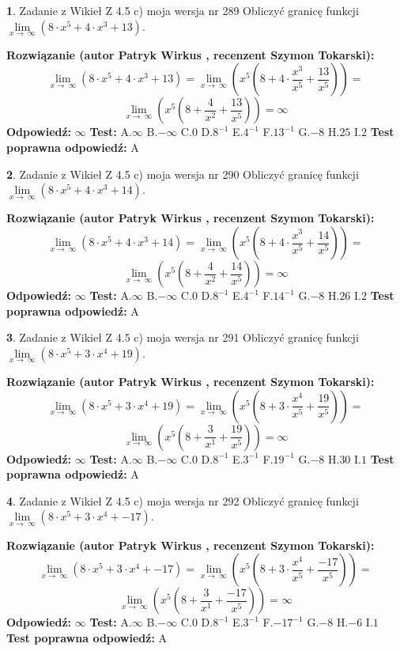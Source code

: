 \documentclass[12pt, a4paper]{article}
\theoremstyle{definition} %
\newtheorem{zad}{}
\newcommand{\zadStart}[1]{\begin{zad}#1\newline}
\newcommand{\zadStop}{\end{zad}}
\newcommand{\rozwStart}[2]{\noindent \textbf{Rozwiązanie (autor #1 , recenzent #2): }\newline}
\newcommand{\rozwStop}{\newline}
\newcommand{\odpStart}{\noindent \textbf{Odpowiedź:}\newline}
\newcommand{\odpStop}{\newline}
\newcommand{\testStart}{\noindent \textbf{Test:}\newline}
\newcommand{\testStop}{\newline}
\newcommand{\kluczStart}{\noindent \textbf{Test poprawna odpowiedź:}\newline}
\newcommand{\kluczStop}{\newline}
\begin{document}
\zadStart{Zadanie z Wikieł Z 4.5 c) moja wersja nr 289}
Obliczyć granicę funkcji  $\lim\limits_{x\to\ \infty}(8 \cdot x^{5}+4 \cdot x^{3}+13)$.
\zadStop
\rozwStart{Patryk Wirkus}{Szymon Tokarski}
$$\lim\limits_{x\to\ \infty}(8 \cdot x^{5}+4 \cdot x^{3}+13) = \lim\limits_{x\to\ \infty}(x^{5}(8 +4 \cdot \frac{x^{3}}{x^{5}}+\frac{13}{x^{5}})) =$$ $$\lim\limits_{x\to\ \infty}(x^{5}(8 +\frac{4}{x^{2}}+\frac{13}{x^{5}})) =\infty$$
\rozwStop
\odpStart
$\infty$
\odpStop
\testStart
A.$\infty$ B.$-\infty$ C.$0$ D.$8^{-1}$ E.$4^{-1}$
F.$13^{-1}$ G.$-8$
H.$25$
I.$2$
\testStop
\kluczStart
A
\kluczStop



\zadStart{Zadanie z Wikieł Z 4.5 c) moja wersja nr 290}
Obliczyć granicę funkcji  $\lim\limits_{x\to\ \infty}(8 \cdot x^{5}+4 \cdot x^{3}+14)$.
\zadStop
\rozwStart{Patryk Wirkus}{Szymon Tokarski}
$$\lim\limits_{x\to\ \infty}(8 \cdot x^{5}+4 \cdot x^{3}+14) = \lim\limits_{x\to\ \infty}(x^{5}(8 +4 \cdot \frac{x^{3}}{x^{5}}+\frac{14}{x^{5}})) =$$ $$\lim\limits_{x\to\ \infty}(x^{5}(8 +\frac{4}{x^{2}}+\frac{14}{x^{5}})) =\infty$$
\rozwStop
\odpStart
$\infty$
\odpStop
\testStart
A.$\infty$ B.$-\infty$ C.$0$ D.$8^{-1}$ E.$4^{-1}$
F.$14^{-1}$ G.$-8$
H.$26$
I.$2$
\testStop
\kluczStart
A
\kluczStop



\zadStart{Zadanie z Wikieł Z 4.5 c) moja wersja nr 291}
Obliczyć granicę funkcji  $\lim\limits_{x\to\ \infty}(8 \cdot x^{5}+3 \cdot x^{4}+19)$.
\zadStop
\rozwStart{Patryk Wirkus}{Szymon Tokarski}
$$\lim\limits_{x\to\ \infty}(8 \cdot x^{5}+3 \cdot x^{4}+19) = \lim\limits_{x\to\ \infty}(x^{5}(8 +3 \cdot \frac{x^{4}}{x^{5}}+\frac{19}{x^{5}})) =$$ $$\lim\limits_{x\to\ \infty}(x^{5}(8 +\frac{3}{x^{1}}+\frac{19}{x^{5}})) =\infty$$
\rozwStop
\odpStart
$\infty$
\odpStop
\testStart
A.$\infty$ B.$-\infty$ C.$0$ D.$8^{-1}$ E.$3^{-1}$
F.$19^{-1}$ G.$-8$
H.$30$
I.$1$
\testStop
\kluczStart
A
\kluczStop



\zadStart{Zadanie z Wikieł Z 4.5 c) moja wersja nr 292}
Obliczyć granicę funkcji  $\lim\limits_{x\to\ \infty}(8 \cdot x^{5}+3 \cdot x^{4}+-17)$.
\zadStop
\rozwStart{Patryk Wirkus}{Szymon Tokarski}
$$\lim\limits_{x\to\ \infty}(8 \cdot x^{5}+3 \cdot x^{4}+-17) = \lim\limits_{x\to\ \infty}(x^{5}(8 +3 \cdot \frac{x^{4}}{x^{5}}+\frac{-17}{x^{5}})) =$$ $$\lim\limits_{x\to\ \infty}(x^{5}(8 +\frac{3}{x^{1}}+\frac{-17}{x^{5}})) =\infty$$
\rozwStop
\odpStart
$\infty$
\odpStop
\testStart
A.$\infty$ B.$-\infty$ C.$0$ D.$8^{-1}$ E.$3^{-1}$
F.$-17^{-1}$ G.$-8$
H.$-6$
I.$1$
\testStop
\kluczStart
A
\kluczStop
\end{document}
